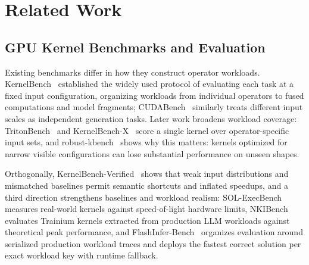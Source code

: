 \section{Related Work}
\label{sec:related}
\subsection{GPU Kernel Benchmarks and Evaluation}
\label{subsec:related_benchmark}

Existing benchmarks differ in how they construct operator workloads. 
KernelBench~\cite{ouyang2025kernelbench} established the widely used protocol
of evaluating each task at a fixed input configuration, organizing workloads
from individual operators to fused computations and model fragments;
CUDABench~\cite{cudabench} similarly treats different input scales as
independent generation tasks. Later work broadens workload coverage:
TritonBench~\cite{tritonbench} and KernelBench-X~\cite{kernelbenchx} score a
single kernel over operator-specific input sets, and
robust-kbench~\cite{lange2025robustkbench} shows why this matters: kernels
optimized for narrow visible configurations can lose substantial performance
on unseen shapes. 



Orthogonally,
KernelBench-Verified~\cite{zhang2026kernelbenchverified} shows that weak
input distributions and mismatched baselines permit semantic shortcuts and
inflated speedups, and a third direction strengthens baselines and workload
realism: SOL-ExecBench~\cite{execbench} measures real-world kernels against
speed-of-light hardware limits, NKIBench~\cite{accelopt} evaluates Trainium
kernels extracted from production LLM workloads against theoretical peak
performance, and FlashInfer-Bench~\cite{flashinferbench} organizes evaluation
around serialized production workload traces and deploys the fastest correct
solution per exact workload key with runtime fallback.

